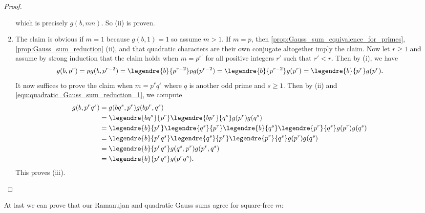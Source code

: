 \begin{proof}
\begin{enumerate}[label=(\roman*)]
\[              \]
              which is precisely $g(b,mn)$. So (ii) is proven.
            \item The claim is obvious if $m = 1$ because $g(b,1) = 1$ so assume $m > 1$. If $m = p$, then \cref{prop:Gauss_sum_equivalence_for_primes}, \cref{prop:Gauss_sum_reduction} (ii), and that quadratic characters are their own conjugate altogether imply the claim. Now let $r \ge 1$ and assume by strong induction that the claim holds when $m = p^{r'}$ for all positive integers $r'$ such that $r' < r$. Then by (i), we have
            \begin{equation}\label{equ:quadratic_Gauss_sum_reduction_1}
              g(b,p^{r}) = pg(b,p^{r-2}) = \legendre{b}{p^{r-2}}pg(p^{r-2}) = \legendre{b}{p^{r-2}}g(p^{r}) = \legendre{b}{p^{r}}g(p^{r}).
            \end{equation}
            It now suffices to prove the claim when $m = p^{r}q^{s}$ where $q$ is another odd prime and $s \ge 1$. Then by (ii) and \cref{equ:quadratic_Gauss_sum_reduction_1}, we compute
            \begin{align*}
              g(b,p^{r}q^{s}) &= g(bq^{s},p^{r})g(bp^{r},q^{s}) \\
              &= \legendre{bq^{s}}{p^{r}}\legendre{bp^{r}}{q^{s}}g(p^{r})g(q^{s}) \\
              &= \legendre{b}{p^{r}}\legendre{q^{s}}{p^{r}}\legendre{b}{q^{s}}\legendre{p^{r}}{q^{s}}g(p^{r})g(q^{s}) \\
              &= \legendre{b}{p^{r}q^{s}}\legendre{q^{s}}{p^{r}}\legendre{p^{r}}{q^{s}}g(p^{r})g(q^{s}) \\
              &= \legendre{b}{p^{r}q^{s}}g(q^{s},p^{r})g(p^{r},q^{s}) \\
              &= \legendre{b}{p^{r}q^{s}}g(p^{r}q^{s}).
            \end{align*}
            This proves (iii).
          \end{enumerate}
        \end{proof}

        At last we can prove that our Ramanujan and quadratic Gauss sums agree for square-free $m$:

